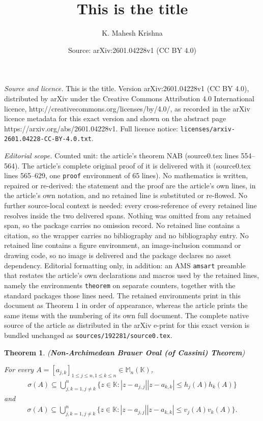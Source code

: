 \documentclass[10pt,a4paper]{amsart}
\title{This is the title}
\author{K. Mahesh Krishna}
\date{Source: arXiv:2601.04228v1 (CC BY 4.0)}
\newtheorem{theorem}{Theorem}
\begin{document}
\maketitle

\noindent\emph{Source and licence.} This is the title. Version arXiv:2601.04228v1 (CC BY 4.0), distributed by arXiv under the Creative Commons Attribution 4.0 International licence, http://creativecommons.org/licenses/by/4.0/, as recorded in the arXiv licence metadata for this exact version and shown on the abstract page https://arxiv.org/abs/2601.04228v1. Full licence notice: \texttt{licenses/arxiv-2601.04228-CC-BY-4.0.txt}.\par\smallskip

\noindent\textit{Editorial scope.} Counted unit: the article's theorem NAB (source0.tex lines 554--564). The article's complete original proof of it is delivered with it (source0.tex lines 565--629, one \texttt{proof} environment of 65 lines). No mathematics is written, repaired or re-derived: the statement and the proof are the article's own lines, in the article's own notation, and no retained line is substituted or re-flowed.  No further source-local context is needed: every cross-reference of every retained line resolves inside the two delivered spans.  Nothing was omitted from any retained span, so the package carries no omission record.  No retained line contains a citation, so the wrapper carries no bibliography and no bibliography entry.  No retained line contains a figure environment, an image-inclusion command or drawing code, so no image is delivered and the package declares no asset dependency.  Editorial formatting only, in addition: an AMS \texttt{amsart} preamble that restates the article's own declarations and macros used by the retained lines, namely the environments \texttt{theorem} on separate counters, together with the standard packages those lines need.  The retained environments print in this document as Theorem 1 in order of appearance, whereas the article prints the same items with the numbering of its own full document.  The complete native source of the article as distributed in the arXiv e-print for this exact version is bundled unchanged as \texttt{sources/192281/source0.tex}.
\begin{theorem}  \label{NAB} (\textbf{Non-Archimedean Brauer Oval (of Cassini) Theorem})

For every $A=[a_{j,k}]_{1\leq j\leq n, 1\leq k \leq n}\in  \mathbb{M}_n(\mathbb{K})$,
\begin{align*}
	\sigma(A)\subseteq \bigcup_{j,k=1, j \neq k}^n\{z \in \mathbb{K}: |z-a_{j, j}||z-a_{k,k}|\leq h_j(A)h_k(A)\}
\end{align*}
and 
\begin{align*}
	\sigma(A)\subseteq \bigcup_{j,k=1, j \neq k}^n\{z \in \mathbb{K}: |z-a_{j, j}||z-a_{k,k}|\leq v_j(A)v_k(A)\}.
\end{align*}	
\end{theorem}
\end{document}
